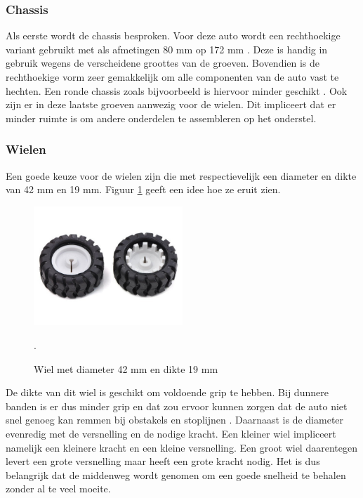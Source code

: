 \documentclass[a4paper,twoside,kulak]{kulakreport} %
\begin{document}
\subsubsection{Chassis}
Als eerste wordt de chassis besproken. Voor deze auto wordt een rechthoekige variant gebruikt met als afmetingen 80 mm op 172 mm  \cite{RobotChassisRechthoekigZwart}. 
Deze is handig in gebruik wegens de verscheidene groottes van de groeven. %
Bovendien is de rechthoekige vorm zeer gemakkelijk om alle componenten van de auto vast te hechten. Een ronde chassis zoals bijvoorbeeld is hiervoor minder geschikt \cite{RobotChassis}. Ook zijn er in deze laatste groeven aanwezig voor de wielen. 
Dit impliceert dat er minder ruimte is om andere onderdelen te assembleren op het onderstel. %
\label{Chassis}

\subsubsection{Wielen}
Een goede keuze voor de wielen zijn die met respectievelijk een diameter en dikte van 42 mm en 19 mm.
Figuur \ref{fig:wiel} geeft een idee hoe ze eruit zien.

\begin{figure}
	\includegraphics[width=0.5\textwidth]{wielen}
	\centering
	\caption{Wiel met diameter 42 mm en dikte 19 mm} 
	\cite{Wiel42x19mm}.
	\label{fig:wiel}
\end{figure}

De dikte van dit wiel is geschikt om voldoende grip te hebben. Bij dunnere banden is er dus minder grip en dat zou ervoor kunnen zorgen dat de auto niet snel genoeg kan remmen bij obstakels en stoplijnen \cite{Banden}. Daarnaast is de diameter evenredig met de versnelling en de nodige kracht.
Een kleiner wiel impliceert namelijk een kleinere kracht en een kleine versnelling. Een groot wiel daarentegen levert een grote versnelling maar heeft een grote kracht nodig. Het is dus belangrijk dat de middenweg wordt genomen om een goede snelheid te behalen zonder al te veel moeite.  
\end{document}
